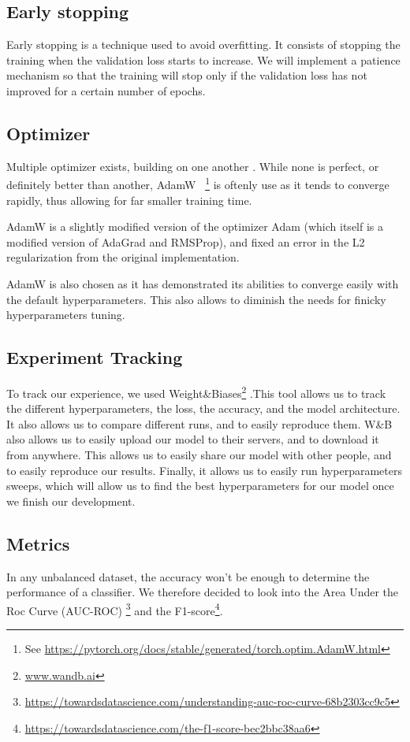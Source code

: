 \documentclass[11pt]{article}
\begin{document}
    \subsection{Early stopping}

        Early stopping is a technique used to avoid overfitting. It consists of stopping the training when the validation loss starts to increase. We will
        implement a patience mechanism so that the training will stop only if the validation loss has not improved for a certain number of epochs.
    \subsection{Optimizer}

        Multiple optimizer exists, building on one another . While none is perfect, or definitely better than another, AdamW~\cite{adamw} \footnote{See \url{https://pytorch.org/docs/stable/generated/torch.optim.AdamW.html}} is oftenly use as it tends
        to converge rapidly, thus allowing for far smaller training time.

        AdamW is a slightly modified version of the optimizer Adam (which itself is a modified version of AdaGrad and RMSProp), and fixed an error in the L2 regularization from the original implementation.

        AdamW is also chosen as it has demonstrated its abilities to converge easily with the default hyperparameters. This also allows to diminish the needs for finicky hyperparameters tuning.


    \subsection{Experiment Tracking}
        To track our experience, we used Weight\&Biases\footnote{\url{www.wandb.ai}} .This tool allows us to track the different hyperparameters,
        the loss, the accuracy, and the model architecture. It also allows us to compare different runs, and to easily reproduce them.
        W\&B also allows us to easily upload our model to their servers, and to download it from anywhere. This
        allows us to easily share our model with other people, and to easily reproduce our results. Finally, it allows us
        to easily run hyperparameters sweeps, which will allow us to find the best hyperparameters for our model once we
        finish our development.

    \subsection{Metrics}
        In any unbalanced dataset, the accuracy won't be enough to determine the performance of a classifier.
        We therefore decided to look into the Area Under the Roc Curve (AUC-ROC) \footnote{\url{https://towardsdatascience.com/understanding-auc-roc-curve-68b2303cc9c5}}
        and the F1-score\footnote{\url{https://towardsdatascience.com/the-f1-score-bec2bbc38aa6}}.
\end{document}
